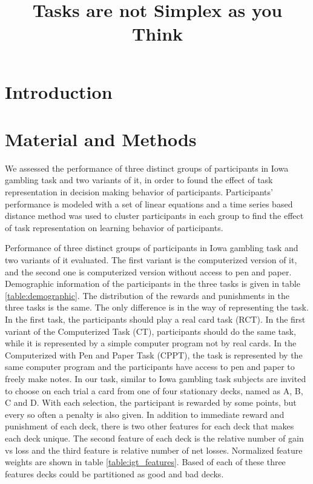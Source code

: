 \documentclass[12pt,twocolumn]{elsarticle}
\title{Tasks are not Simplex as you Think}
\author{}
\begin{document}
\maketitle
\section{Introduction}
\section{Material and Methods}

We assessed the performance of three
distinct groups of participants in Iowa
gambling task and two variants of it, in
order to found the effect of task
representation in decision making
behavior of participants. Participants'
performance is modeled with a set of
linear equations and a time series based
distance method was used to cluster
participants in each group to find the
effect of task representation on
learning behavior of participants.


Performance of three distinct groups of
participants in Iowa gambling task and
two variants of it evaluated.  The first
variant is the computerized version of
it, and the second one is computerized
version without access to pen and paper.
Demographic information of the
participants in the three tasks is given
in table \ref{table:demographic}.
The distribution of the rewards and
punishments in the three tasks is the
same. The only difference is in the way
of representing the task.  In the first
task, the participants should play a
real card task (RCT). In the first
variant of the Computerized Task (CT),
participants should do the same task,
while it is represented by a simple
computer program not by real cards. In
the Computerized with Pen and Paper Task
(CPPT), the task is represented by the
same computer program and the
participants have access to pen and
paper to freely make notes.  In our
task, similar to Iowa gambling task
subjects are invited to choose on each
trial a card from one of four stationary
decks, named as A, B, C and D. With each
selection, the participant is rewarded
by some points, but every so often a
penalty is also given. In addition to
immediate reward and punishment of each
deck, there is two other features for
each deck that makes each deck unique.
The second feature of each deck is the
relative number of gain vs loss and the
third feature is relative number of net
losses.  Normalized feature weights are
shown in table \ref{table:igt_features}.
Based of each of these three features
decks could be partitioned as
good and bad decks.
\end{document}
